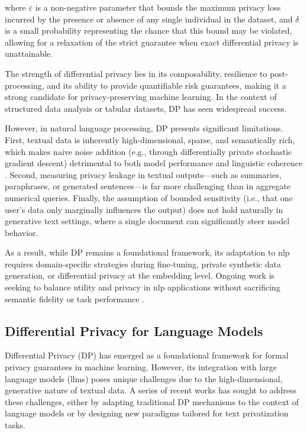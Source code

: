 where $\varepsilon$ is a non-negative parameter that bounds the maximum privacy loss incurred by the presence or absence of any single individual in the dataset, and $\delta$ is a small probability representing the chance that this bound may be violated, allowing for a relaxation of the strict guarantee when exact differential privacy is unattainable.

The strength of differential privacy lies in its composability, resilience to post-processing, and its ability to provide quantifiable risk guarantees, making it a strong candidate for privacy-preserving machine learning. In the context of structured data analysis or tabular datasets, DP has seen widespread success.

However, in natural language processing, DP presents significant limitations. First, textual data is inherently high-dimensional, sparse, and semantically rich, which makes naive noise addition (e.g., through differentially private stochastic gradient descent) detrimental to both model performance and linguistic coherence \citep{li2022large,carlini2021extracting}. Second, measuring privacy leakage in textual outputs—such as summaries, paraphrases, or generated sentences—is far more challenging than in aggregate numerical queries. Finally, the assumption of bounded sensitivity (i.e., that one user’s data only marginally influences the output) does not hold naturally in generative text settings, where a single document can significantly steer model behavior.

As a result, while DP remains a foundational framework, its adaptation to \gls{nlp} requires domain-specific strategies during fine-tuning, private synthetic data generation, or differential privacy at the embedding level. Ongoing work is seeking to balance utility and privacy in \gls{nlp} applications without sacrificing semantic fidelity or task performance \citep{abadi2016deep,li2022large}.

\subsection{Differential Privacy for Language Models}

Differential Privacy (DP) has emerged as a foundational framework for formal privacy guarantees in machine learning. However, its integration with large language models (\glspl{llm}) poses unique challenges due to the high-dimensional, generative nature of textual data. A series of recent works has sought to address these challenges, either by adapting traditional DP mechanisms to the context of language models or by designing new paradigms tailored for text privatization tasks.

